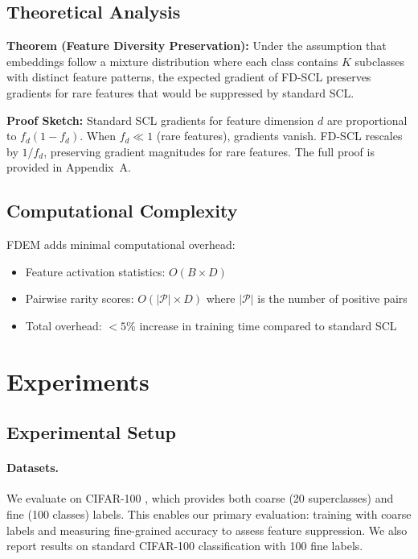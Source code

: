 \documentclass[11pt,a4paper]{article}
\newcommand{\cP}{\mathcal{P}}
\begin{document}
\subsection{Theoretical Analysis}

\textbf{Theorem (Feature Diversity Preservation):} Under the assumption that embeddings follow a mixture distribution where each class contains $K$ subclasses with distinct feature patterns, the expected gradient of FD-SCL preserves gradients for rare features that would be suppressed by standard SCL.

\textbf{Proof Sketch:} Standard SCL gradients for feature dimension $d$ are proportional to $f_d(1-f_d)$. When $f_d \ll 1$ (rare features), gradients vanish. FD-SCL rescales by $1/f_d$, preserving gradient magnitudes for rare features. The full proof is provided in Appendix~A.

\subsection{Computational Complexity}

FDEM adds minimal computational overhead:
\begin{itemize}
    \item Feature activation statistics: $O(B \times D)$
    \item Pairwise rarity scores: $O(|\cP| \times D)$ where $|\cP|$ is the number of positive pairs
    \item Total overhead: $<5\%$ increase in training time compared to standard SCL
\end{itemize}

\section{Experiments}

\subsection{Experimental Setup}

\paragraph{Datasets.}
We evaluate on CIFAR-100 \citep{krizhevsky2009learning}, which provides both coarse (20 superclasses) and fine (100 classes) labels. This enables our primary evaluation: training with coarse labels and measuring fine-grained accuracy to assess feature suppression. We also report results on standard CIFAR-100 classification with 100 fine labels.
\end{document}
